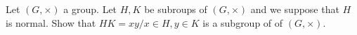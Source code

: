 Let $(G, \times)$ a group. Let $H, K$ be subroups of $(G, \times)$ and we suppose that $H$ is normal.
Show that $HK = {xy / x \in H, y \in K}$ is a subgroup of of $(G, \times)$.